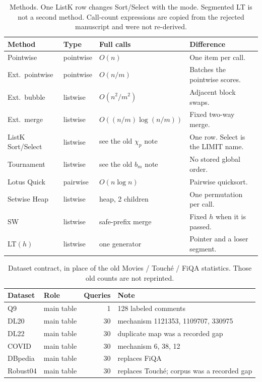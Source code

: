 \begin{table}[t]
\caption{Methods. One ListK row changes Sort/Select with the mode. Segmented LT is not a second method. Call-count expressions are copied from the rejected manuscript and were not re-derived.}
\centering\footnotesize
\setlength{\tabcolsep}{3pt}
\begin{tabular}{@{}lllp{3.3cm}@{}}
\toprule
Method & Type & Full calls & Difference \\
\midrule
Pointwise & pointwise & $O(n)$ & One item per call. \\
Ext.\ pointwise & pointwise & $O(n/m)$ & Batches the pointwise scores. \\
Ext.\ bubble & listwise & $O(n^2/m^2)$ & Adjacent block swaps. \\
Ext.\ merge & listwise & $O((n/m)\log(n/m))$ & Fixed two-way merge. \\
ListK Sort/Select & listwise & see the old $\chi_p$ note & One row. Select is the LIMIT name. \\
Tournament & listwise & see the old $b_m$ note & No stored global order. \\
Lotus Quick & pairwise & $O(n\log n)$ & Pairwise quicksort. \\
Setwise Heap & listwise & heap, 2 children & One permutation per call. \\
SW & listwise & safe-prefix merge & Fixed $h$ when it is passed. \\
LT$(h)$ & listwise & one generator & Pointer and a loser segment. \\
\bottomrule
\end{tabular}
\end{table}

\begin{table}[t]
\caption{Dataset contract, in place of the old Movies / Touch\'e / FiQA statistics. Those old counts are not reprinted.}
\centering\footnotesize
\begin{tabular}{@{}llrl@{}}
\toprule
Dataset & Role & Queries & Note \\
\midrule
Q9 & main table & 1 & 128 labeled comments \\
DL20 & main table & 30 & mechanism 1121353, 1109707, 330975 \\
DL22 & main table & 30 & duplicate map was a recorded gap \\
COVID & main table & 30 & mechanism 6, 38, 12 \\
DBpedia & main table & 30 & replaces FiQA \\
Robust04 & main table & 30 & replaces Touch\'e; corpus was a recorded gap \\
\bottomrule
\end{tabular}
\end{table}

